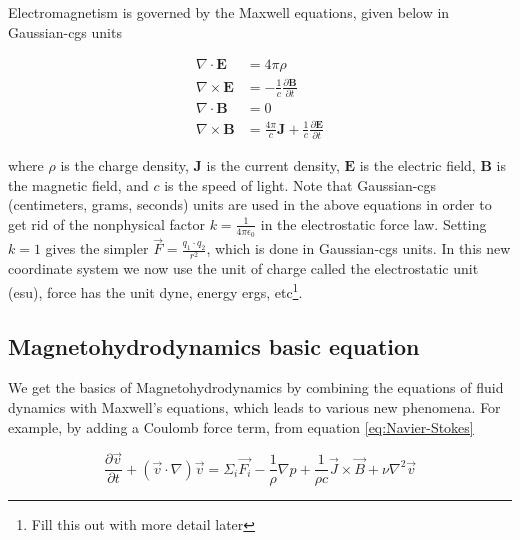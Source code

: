Electromagnetism is governed by the Maxwell equations, given below in Gaussian-cgs units

\begin{align}\label{eq:Maxwells}
    \nabla \cdot \mathbf{E} &= 4\pi\rho \\
    \nabla \times \mathbf{E} &= -\frac{1}{c} \frac{\partial \mathbf{B}}{\partial t}\label{eq:Maxwell grad E} \\
    \nabla \cdot \mathbf{B} &= 0 \\
    \nabla \times \mathbf{B} &= \frac{4\pi}{c} \mathbf{J} + \frac{1}{c} \frac{\partial \mathbf{E}}{\partial t}\label{eq:Maxwell Partial E}
\end{align}

where $\rho$ is the charge density, $\mathbf{J}$ is the current density, $\mathbf{E}$ is the electric field, $\mathbf{B}$ is the magnetic field, and $c$ is the speed of light. Note that Gaussian-cgs (centimeters, grams, seconds) units are used in the above equations in order to get rid of the nonphysical factor $k=\frac{1}{4\pi \epsilon_0}$ in the electrostatic force law. Setting $k=1$ gives the simpler $\Vec{F} = \frac{q_1 \cdot q_2}{r^2}$, which is done in Gaussian-cgs units. In this new coordinate system we now use the unit of charge called the electrostatic unit (esu), force has the unit dyne, energy ergs, etc\footnote{Fill this out with more detail later}.


\subsection{Magnetohydrodynamics basic equation}

We get the basics of Magnetohydrodynamics by combining the equations of fluid dynamics with Maxwell's equations, which leads to various new phenomena. For example, by adding a Coulomb force term, from equation \ref{eq:Navier-Stokes}

\begin{equation}\label{eq:Navier-Stokes added in Coulomb}
    \frac{\partial \Vec{v}}{\partial t} + (\Vec{v}\cdot\nabla)\Vec{v} = 
    \Sigma_{i}\Vec{F_i} - 
    \frac{1}{\rho} \nabla p + 
    \frac{1}{\rho c} \Vec{J} \times \Vec{B} +
    \nu \nabla^2 \Vec{v}
\end{equation}

